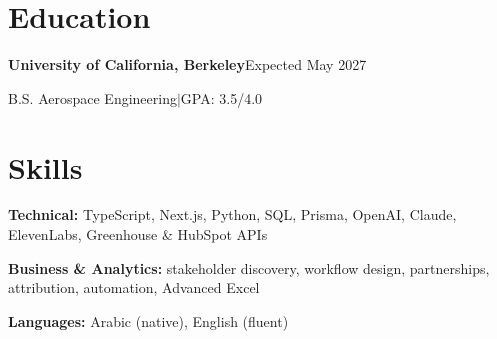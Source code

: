 \documentclass[a4paper,10pt]{article}
\begin{document}
\section{Education}
\textbf{University of California, Berkeley}\hfill Expected May 2027\par
B.S. Aerospace Engineering\enspace$|$\enspace GPA: 3.5/4.0\par

\section{Skills}
\textbf{Technical:} TypeScript, Next.js, Python, SQL, Prisma, OpenAI, Claude, ElevenLabs, Greenhouse \& HubSpot APIs\par
\textbf{Business \& Analytics:} stakeholder discovery, workflow design, partnerships, attribution, automation, Advanced Excel\par
\textbf{Languages:} Arabic (native), English (fluent)
\end{document}
